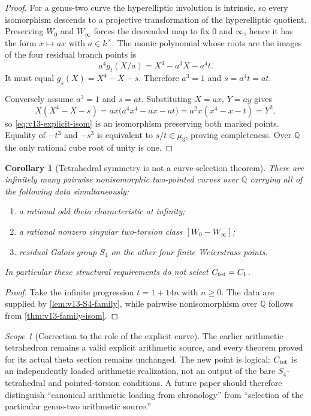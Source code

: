 \documentclass[11pt]{article}
\newtheorem{corollary}[corollary]{Corollary}
\theoremstyle{definition}
\theoremstyle{remark}
\newtheorem{scope}[scope]{Scope}
\begin{document}
\begin{proof}
For a genus-two curve the hyperelliptic involution is intrinsic, so every
isomorphism descends to a projective transformation of the hyperelliptic
quotient.  Preserving $W_0$ and $W_\infty$ forces the descended map to fix
$0$ and $\infty$, hence it has the form $x\mapsto ax$ with $a\in k^\times$.
The monic polynomial whose roots are the images of the four residual branch
points is
\[
 a^4 g_t(X/a)=X^4-a^3X-a^4t.
\]
It must equal $g_s(X)=X^4-X-s$.  Therefore $a^3=1$ and
$s=a^4t=at$.

Conversely assume $a^3=1$ and $s=at$.  Substituting
$X=ax$, $Y=ay$ gives
\[
 X(X^4-X-s)
 =a x\bigl(a^4x^4-a x-a t\bigr)
 =a^2x(x^4-x-t)
 =Y^2,
\]
so \cref{eq:v13-explicit-isom} is an isomorphism preserving both marked
points.  Equality of $-t^3$ and $-s^3$ is equivalent to $s/t\in\mu_3$,
proving completeness.  Over $\mathbb Q$ the only rational cube root of unity
is one.
\end{proof}

\begin{corollary}[Tetrahedral symmetry is not a curve-selection theorem]
\label{cor:v13-nonselection}
There are infinitely many pairwise nonisomorphic two-pointed curves over
$\mathbb Q$ carrying all of the following data simultaneously:
\begin{enumerate}[label=(\roman*)]
\item a rational odd theta characteristic at infinity;
\item a rational nonzero singular two-torsion class $[W_0-W_\infty]$;
\item residual Galois group $S_4$ on the other four finite Weierstrass points.
\end{enumerate}
In particular these structural requirements do not select $C_{\rm tet}=C_1$.
\end{corollary}

\begin{proof}
Take the infinite progression $t=1+14n$ with $n\ge0$.  The data are supplied
by \cref{lem:v13-S4-family}, while pairwise nonisomorphism over $\mathbb Q$
follows from \cref{thm:v13-family-isom}.
\end{proof}

\begin{scope}[Correction to the role of the explicit curve]
The earlier arithmetic tetrahedron remains a valid explicit arithmetic source,
and every theorem proved for its actual theta section remains unchanged.  The
new point is logical: $C_{\rm tet}$ is an independently loaded arithmetic
realization, not an output of the bare $S_4$-tetrahedral and pointed-torsion
conditions.  A future paper should therefore distinguish
``canonical arithmetic loading from chronology'' from
``selection of the particular genus-two arithmetic source.''
\end{scope}
\end{document}
